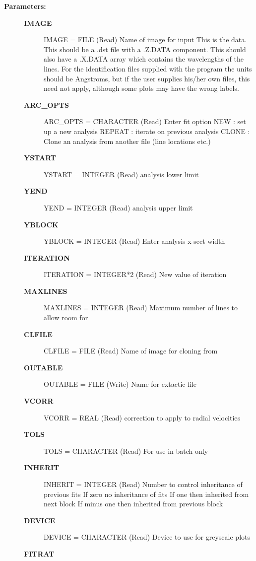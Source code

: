 \begin{description}
\item [{\bf Parameters:}]
\begin{description}
\item [{\bf IMAGE}]
   IMAGE = FILE (Read)
        Name of image for input
                This is the data. This should be a .dst file with
                a .Z.DATA component. This should also have a .X.DATA
                array which contains the wavelengths of the lines.
                For the identification files supplied with the program
                the units should be Angstroms, but if the user supplies
                his/her own files, this need not apply, although some
                plots may have the wrong labels.
\item [{\bf ARC_OPTS}]
   ARC_OPTS = CHARACTER (Read)
        Enter fit option
                 NEW    : set up a new analysis
                 REPEAT : iterate on previous analysis
                 CLONE  : Clone an analysis from another file
                          (line locations etc.)
\item [{\bf YSTART}]
   YSTART = INTEGER (Read)
        analysis lower limit
\item [{\bf YEND}]
   YEND = INTEGER (Read)
        analysis upper limit
\item [{\bf YBLOCK}]
   YBLOCK = INTEGER (Read)
        Enter analysis x-sect width
\item [{\bf ITERATION}]
   ITERATION = INTEGER*2 (Read)
        New value of iteration
\item [{\bf MAXLINES}]
   MAXLINES = INTEGER (Read)
        Maximum number of lines to allow room for
\item [{\bf CLFILE}]
   CLFILE = FILE (Read)
        Name of image for cloning from
\item [{\bf OUTABLE}]
   OUTABLE = FILE (Write)
        Name for extactic file
\item [{\bf VCORR}]
   VCORR = REAL (Read)
        correction to apply to radial velocities
\item [{\bf TOLS}]
   TOLS = CHARACTER (Read)
        For use in batch only
\item [{\bf INHERIT}]
   INHERIT = INTEGER (Read)
        Number to control inheritance of  previous fits
                 If zero no inheritance of fits
                 If one then inherited from next block
                 If minus one then inherited from previous block
\item [{\bf DEVICE}]
   DEVICE = CHARACTER (Read)
        Device to use for greyscale plots
\item [{\bf FITRAT}]

\end{description}
\end{description}

